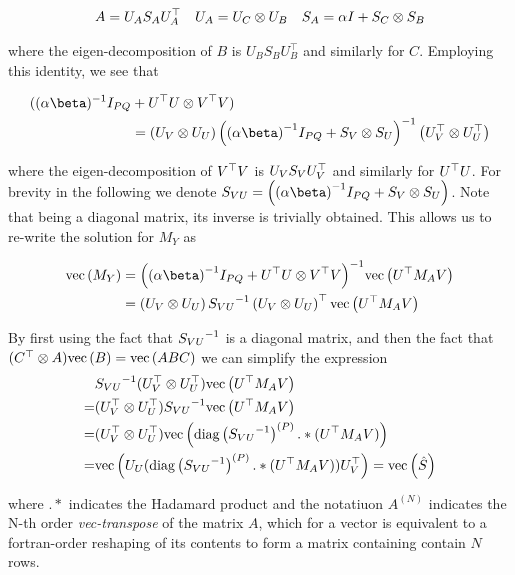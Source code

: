 \begin{align}
A & = U_A S_A U_A^\top & U_A & = U_C \otimes U_B & S_A = \alpha I + S_C \otimes S_B
\end{align}

where the eigen-decomposition of $B$ is $U_B S_B U_B^\top$ and similarly for $C$. Employing this identity, we see that

\begin{align}
\begin{split}
((\alpha \beta)^{-1} I_{PQ} & + U\T U \otimes V\T V) \\
& =  \left(U_V \otimes U_U\right)
  \invb{\invb{\alpha \beta} I_{PQ} + S_V \otimes S_U}
  \left(U_V\T \otimes U_U\T\right)
\end{split}
\end{align}

where the eigen-decomposition of $V^\top V$ is $U_V S_V U_V^\top$ and similarly for $U^\top U$. For brevity in the following we denote $S_{VU} = \left(\invb{\alpha \beta} I_{PQ} + S_V \otimes S_U\right)$. Note that being a diagonal matrix, its inverse is trivially obtained. This allows us to re-write the solution for $M_Y$ as

\begin{align}
\vecf{M_Y} 
    & = \invb{\invb{\alpha \beta} I_{PQ} + U\T U \otimes V\T V}\vecf{U\T M_A V} \\
    & = \left(U_V \otimes U_U\right) \inv{S_{VU}} \left(U_V \otimes U_U\right)\T \vecf{U\T M_A V}
\end{align}

By first using the fact that ${S_{VU}}^{-1}$ is a diagonal matrix, and then the fact that $(C^\top \otimes A)\text{vec}\left(B\right) = \text{vec}\left(ABC\right)$ we can simplify the expression 
\begin{align}
 &{S_{VU}}^{-1}(U_V^\top \otimes U_U^\top) \text{vec}\left(U^\top M_A V\right) \\
= & (U_V^\top \otimes U_U^\top){S_{VU}}^{-1} \text{vec}\left(U^\top M_A V\right) \\
= & (U_V^\top \otimes U_U^\top)\text{vec}\left(\text{diag} \left( {{S_{VU}}^{-1}} \right)^{(P)} .* (U^\top M_A V)\right) \\
= & \text{vec}\left(U_U (\text{diag} \left( {{S_{VU}}^{-1}} \right)^{(P)} .* (U^\top M_A V)) U_V^\top\right) = \text{vec}\left(\hat S\right)
\end{align}

where $.*$ indicates the Hadamard product and the notatiuon $A^{(N)}$ indicates the N-th order \emph{vec-transpose}\cite{Minka2000a} of the matrix $A$, which for a vector is equivalent to a fortran-order reshaping of its contents to form a matrix containing contain $N$ rows.

